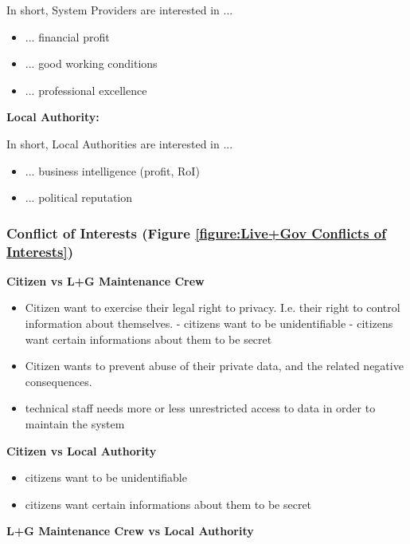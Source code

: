 In short, System Providers are interested in ...
\begin{itemize}
\item ... financial profit
\item ... good working conditions
\item ... professional excellence
\end{itemize}


\textbf{Local Authority:} 

In short, Local Authorities are interested in ...
\begin{itemize}
\item ... business intelligence (profit, RoI)
\item ... political reputation
\end{itemize}


\subsubsection{Conflict of Interests (Figure \ref{figure:Live+Gov Conflicts of Interests})}



\textbf{Citizen vs L+G Maintenance Crew}

\begin{itemize}


\item Citizen want to exercise their legal right to privacy. I.e. their right to control information about themselves.
- citizens want to be unidentifiable
- citizens want certain informations about them to be secret
\item Citizen wants to prevent abuse of their private data, and the related negative consequences.
\item
  technical staff needs more or less unrestricted access to data in
  order to maintain the system
\end{itemize}

\textbf{Citizen vs Local Authority}

\begin{itemize}

\item
  citizens want to be unidentifiable
\item
  citizens want certain informations about them to be secret
\end{itemize}

\textbf{L+G Maintenance Crew vs Local Authority}

